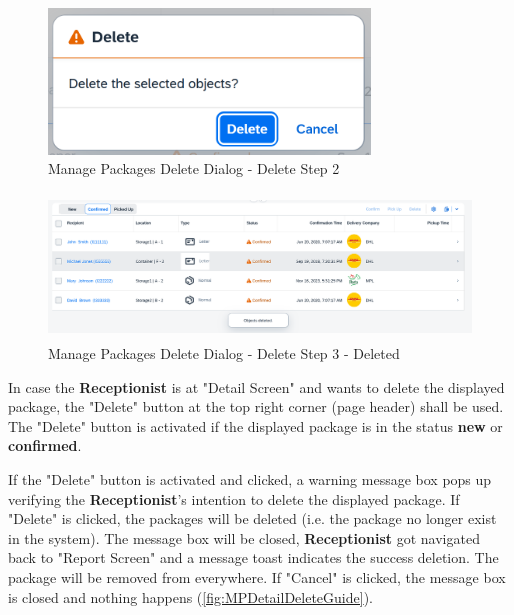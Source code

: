 \begin{figure}[H]
	\centering
	\includegraphics[height=110pt]{images/user_doc/managePack/ReportScreen/delete/deleteDlalog.png}
	\caption{Manage Packages Delete Dialog - Delete Step 2}
	\label{fig:MPReportDeleteDlg}
\end{figure}

\begin{figure}[H]
	\centering
	\includegraphics[height=110pt]{images/user_doc/managePack/ReportScreen/delete/deleteToast.png}
	\caption{Manage Packages Delete Dialog - Delete Step 3 - Deleted}
	\label{fig:MPReportDeleteDone}
\end{figure}


\bigskip
In case the \textbf{Receptionist} is at "Detail Screen" and wants to delete the displayed package, the "Delete" button at the top right corner (page header) shall be used. 
The "Delete" button is activated if the displayed package is in the status \textbf{new} or \textbf{confirmed}.

If the "Delete" button is activated and clicked, a warning message box pops up verifying the \textbf{Receptionist}'s intention to delete the displayed package. If "Delete" is clicked, the packages will be deleted (i.e. the package no longer exist in the system). The message box will be closed, \textbf{Receptionist} got navigated back to "Report Screen" and a message toast indicates the success deletion. The package will be removed from everywhere. If "Cancel" is clicked, the message box is closed and nothing happens (\autoref{fig:MPDetailDeleteGuide}).

